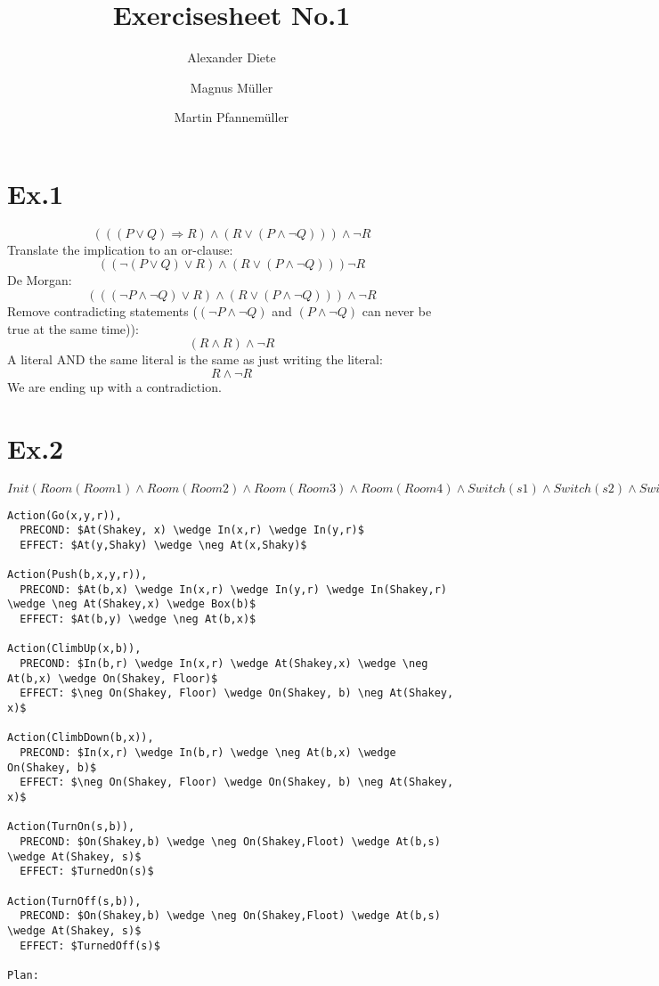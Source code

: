 \documentclass[11pt]{article}
\title{Exercisesheet No.1}
\author{Alexander Diete \and Magnus M\"uller \and Martin Pfannem\"uller}
\begin{document}
\maketitle
\section*{Ex.1}
$$(((P \vee Q) \Rightarrow R) \wedge (R \vee (P \wedge \neg Q))) \wedge \neg R$$
Translate the implication to an or-clause:
$$((\neg(P \vee Q) \vee R) \wedge (R \vee (P \wedge \neg Q))) \neg R$$
De Morgan:
$$(((\neg P \wedge \neg Q) \vee R) \wedge (R \vee (P \wedge \neg Q))) \wedge \neg R$$
Remove contradicting statements ($(\neg P \wedge \neg Q)$ and $(P \wedge \neg Q)$ can never be true at the same time)):
$$(R \wedge R) \wedge \neg R$$
A literal AND the same literal is the same as just writing the literal:
$$R \wedge \neg R$$
We are ending up with a contradiction.

\section*{Ex.2}

$\displaystyle Init(Room(Room1) \wedge Room(Room2) \wedge Room(Room3) \wedge Room(Room4) \wedge Switch(s1) \wedge Switch(s2) \wedge Switch(s3) \wedge Switch(s4) \wedge Box(b1) \wedge Box(b2) \wedge Box(b3) \wedge Box(b4) \wedge At(Shakey,Floor) \wedge In(Shakey,Room3) \wedge TurnedOn(s4) \wedge TurnedOff(s3) \wedge TurnedOff(s2) \wedge TurnedOn(s1) \wedge In(b1,Room1) \wedge In(b2,Room1) \wedge In(b3,Room1) \wedge In(b4,Room1) \wedge At(b1,a) \wedge At(b2,b) \wedge At(b3,c) \wedge At(b4,d) \wedge At(Shakey,e))$

\begin{lstlisting}[mathescape=true]
Action(Go(x,y,r)),
  PRECOND: $At(Shakey, x) \wedge In(x,r) \wedge In(y,r)$
  EFFECT: $At(y,Shaky) \wedge \neg At(x,Shaky)$

Action(Push(b,x,y,r)),
  PRECOND: $At(b,x) \wedge In(x,r) \wedge In(y,r) \wedge In(Shakey,r) \wedge \neg At(Shakey,x) \wedge Box(b)$
  EFFECT: $At(b,y) \wedge \neg At(b,x)$  
  
Action(ClimbUp(x,b)),
  PRECOND: $In(b,r) \wedge In(x,r) \wedge At(Shakey,x) \wedge \neg At(b,x) \wedge On(Shakey, Floor)$
  EFFECT: $\neg On(Shakey, Floor) \wedge On(Shakey, b) \neg At(Shakey, x)$  

Action(ClimbDown(b,x)),
  PRECOND: $In(x,r) \wedge In(b,r) \wedge \neg At(b,x) \wedge On(Shakey, b)$
  EFFECT: $\neg On(Shakey, Floor) \wedge On(Shakey, b) \neg At(Shakey, x)$
  
Action(TurnOn(s,b)),
  PRECOND: $On(Shakey,b) \wedge \neg On(Shakey,Floot) \wedge At(b,s) \wedge At(Shakey, s)$
  EFFECT: $TurnedOn(s)$

Action(TurnOff(s,b)),
  PRECOND: $On(Shakey,b) \wedge \neg On(Shakey,Floot) \wedge At(b,s) \wedge At(Shakey, s)$
  EFFECT: $TurnedOff(s)$

Plan:

\end{lstlisting}
\end{document}
